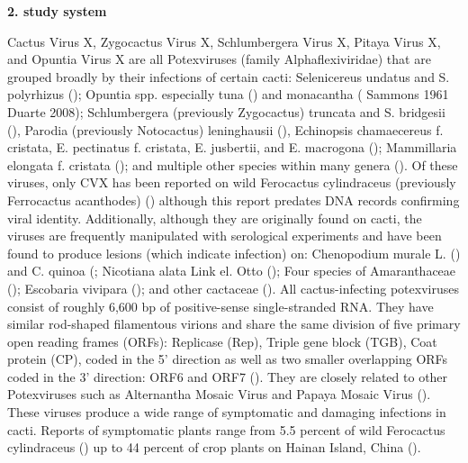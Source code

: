 \documentclass{article}
\begin{document}
\textbf{2. study system}

Cactus Virus X, Zygocactus Virus X, Schlumbergera Virus X, Pitaya Virus X, and Opuntia Virus X are all Potexviruses (family Alphaflexiviridae) that are grouped broadly by their infections of certain cacti: Selenicereus undatus and S. polyrhizus (\cite{li_viral_2015, peng_molecular_2016}); Opuntia spp. especially tuna (\cite{koenig_molecular_2004, duarte_potexvirus_2008}) and monacantha (\cite{attathom_occurrence_1978} Sammons 1961 Duarte 2008); Schlumbergera (previously Zygocactus) truncata and S. bridgesii  (\cite{duarte_potexvirus_2008, koenig_molecular_2004}), Parodia (previously Notocactus) leninghausii (\cite{park_detection_2018}),  Echinopsis chamaecereus f. cristata, E. pectinatus f. cristata, E. jusbertii, and E. macrogona (\cite{maliarenko_cactus_2013}); Mammillaria elongata f. cristata (\cite{maliarenko_cactus_2013}); and multiple other species within many genera (\cite{evallo_brief_2021}). 
Of these viruses, only CVX has been reported on wild Ferocactus cylindraceus (previously Ferrocactus acanthodes) (\cite{attathom_occurrence_1978}) although this report predates DNA records confirming viral identity. 
Additionally, although they are originally found on cacti, the viruses are frequently manipulated with serological experiments and have been found to produce lesions (which indicate infection) on: Chenopodium murale L. (\cite{maliarenko_cactus_2013}) and C. quinoa (\cite{attathom_identification_1978,attathom_occurrence_1978, brandes_untersuchungen_1963-1}; Nicotiana alata Link el. Otto (\cite{maliarenko_cactus_2013}); Four species of Amaranthaceae (\cite{attathom_identification_1978}); Escobaria vivipara (\cite{attathom_identification_1978}); and other cactaceae (\cite{attathom_identification_1978}). 
All cactus-infecting potexviruses consist of roughly 6,600 bp of positive-sense single-stranded RNA. They have similar rod-shaped filamentous virions and share the same division of five primary open reading frames (ORFs): Replicase (Rep), Triple gene block (TGB), Coat protein (CP), coded in the 5' direction as well as two smaller overlapping ORFs coded in the 3' direction: ORF6 and ORF7 (\cite{evallo_brief_2021,liou_complete_2004, martelli_family_2007}). 
They are closely related to other Potexviruses such as Alternantha Mosaic Virus and Papaya Mosaic Virus (\cite{martelli_family_2007, park_detection_2018, liou_complete_2004}). 
These viruses produce a wide range of symptomatic and damaging infections in cacti. 
Reports of symptomatic plants range from 5.5 percent of wild Ferocactus cylindraceus (\cite{attathom_occurrence_1978}) up to 44 percent of crop plants on Hainan Island, China (\cite{peng_molecular_2016}). 
\end{document}
